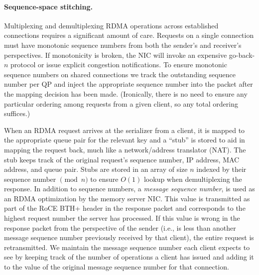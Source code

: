 \paragraph{Sequence-space stitching.}

Multiplexing and demultiplexing RDMA operations across established
connections requires a significant amount of care. Requests on a
single connection must have monotonic sequence numbers from both the
sender's and receiver's perspectives. If monotonicity is broken, the
NIC will invoke an expensive go-back-$n$ protocol or issue explicit
congestion notifications. To ensure monotonic sequence numbers on
shared connections we track the outstanding sequence number per QP and
inject the appropriate sequence number into the packet after the
mapping decision has been made.  (Ironically, there is no need to
ensure any particular ordering among requests from a given client, so
any total ordering suffices.)

When an RDMA request arrives at the serializer from a client, it is
mapped to the appropriate queue pair for the relevant key and a
``stub'' is stored to aid in mapping the request back, much like a
network/address translator (NAT). The stub keeps track of the original
request's sequence number, IP address, MAC address, and queue
pair. Stubs are stored in an array of size $n$ indexed by their
sequence number $\pmod n$ to ensure $O(1)$ lookup when demultiplexing
the response.
In addition to sequence numbers, a \textit{message sequence number},
is used as an RDMA optimization by the memory server NIC. This value
is transmitted as part of the RoCE BTH+ header in the response packet
and corresponds to the highest request number the server has
processed. If this value is wrong in the response packet from the
perspective of the sender (i.e., is less than another message sequence
number previously received by that client), the entire request is
retransmitted.  We maintain the message sequence number each client
expects to see by keeping track of the number of operations a client has
issued and adding it to the value of the original message sequence
number for that connection.

